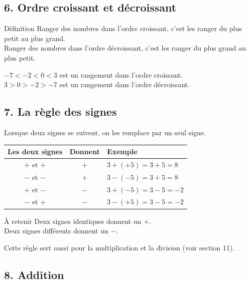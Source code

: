 \newpage
\subsection*{6. Ordre croissant et décroissant}

\begin{regle}{Définition}
Ranger des nombres dans l'ordre \textcolor{themeNO}{croissant}, c'est les ranger du plus petit au plus grand.\\[2pt]
Ranger des nombres dans l'ordre \textcolor{themeNO}{décroissant}, c'est les ranger du plus grand au plus petit.
\end{regle}

\begin{center}
$-7<-2<0<3$ \quad est un rangement dans l'ordre croissant.\\[2pt]
$3>0>-2>-7$ \quad est un rangement dans l'ordre décroissant.
\end{center}

\vfill
\subsection*{7. La règle des signes}

Lorsque deux signes se suivent, on les remplace par un seul signe.

\def\arraystretch{1.6}
\begin{tabularx}{\linewidth}{|c|c|>{\centering\arraybackslash}X|}
\hline
\textbf{Les deux signes} & \textbf{Donnent} & \textbf{Exemple}\\\hline
$+$ et $+$ & $+$ & $3+(+5)=3+5=8$\\\hline
$-$ et $-$ & $+$ & $3-(-5)=3+5=8$\\\hline
$+$ et $-$ & $-$ & $3+(-5)=3-5=-2$\\\hline
$-$ et $+$ & $-$ & $3-(+5)=3-5=-2$\\\hline
\end{tabularx}
\def\arraystretch{1}

\begin{astuce}{À retenir}
Deux signes \textcolor{themeNO}{identiques} donnent un $+$.\\[2pt]
Deux signes \textcolor{themeNO}{différents} donnent un $-$.
\end{astuce}

\vspace{6pt}
Cette règle sert aussi pour la multiplication et la division (voir section 11).

\vfill
\subsection*{8. Addition}

